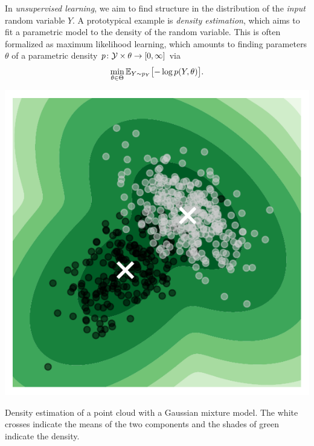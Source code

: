 In \emph{unsupervised learning}, we aim to find structure in the distribution of the \emph{input} random variable \( Y \).
A prototypical example is \emph{density estimation}, which aims to fit a parametric model to the density of the random variable.
This is often formalized as maximum likelihood learning, which amounts to finding parameters \( \theta \) of a parametric density \( \map{p}{\mathcal{Y} \times \theta}{\interval{\num{0}}{\infty}} \) via
\begin{equation}
	\min_{\theta \in \Theta} \mathbb{E}_{Y \sim p_Y}\bigl[ -\log p(Y, \theta) \bigr].
\end{equation}
\begin{sidefigure}
	\includegraphics[width=\marginparwidth]{learning-types/gmm}
	\caption[Unsupervised learning: Density estimation]{
		Density estimation of a point cloud with a Gaussian mixture model.
		The white crosses indicate the means of the two components and the shades of green indicate the density.
	}%
	\label{fig:unsupervised gmm}
\end{sidefigure}

